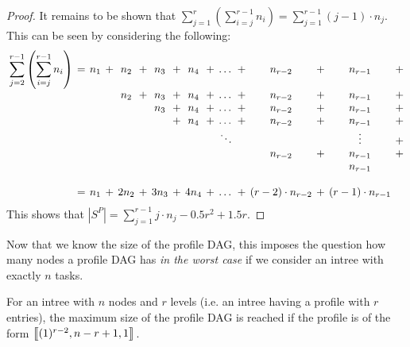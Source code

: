 \begin{proof}
  It remains to be shown that $\sum _{j=1}^{r} \left( \sum _{i=j}^{r-1}n_{{i}} \right) = \sum_{j=1}^{r-1}(j-1)\cdot n_j$. This can be seen by considering the following:
  \begin{eqnarray*}
    \setlength{\arraycolsep}{2pt}
    \begin{array}{cccccccccccccccc}
      \displaystyle
      \sum_{j=2}^{r-1} \left( \sum _{i=j}^{r-1}n_{{i}} \right) &=&
         n_1 & + & n_2 & + & n_3 & + & n_4 & + & \dots & + & n_{r-2} & + & n_{r-1}  & + \\
      & &    &   & n_2 & + & n_3 & + & n_4 & + & \dots & + & n_{r-2} & + & n_{r-1}  & + \\
      & &    &   &     &   & n_3 & + & n_4 & + & \dots & + & n_{r-2} & + & n_{r-1}  & + \\
      & &    &   &     &   &     & + & n_4 & + & \dots & + & n_{r-2} & + & n_{r-1}  & + \\
      & &    &   &     &   &     &  &  &  & \ddots &  &  &  & \vdots  & + \\
      & &    &   &     &   &     &   &     &   &   &   &  n_{r-2}  & +  & n_{r-1}  & +  \\
      & &    &   &     &   &     &   &     &   &   &   &    &   & n_{r-1}  &   \\
      \\
      &=& n_1 &+& 2 n_2 & + & 3 n_3 &+& 4 n_4 &+& \dots & + & (r-2)\cdot n_{r-2} &+& (r-1)\cdot n_{r-1} & \\
    \end{array}
  \end{eqnarray*}
  This shows that $\left|S^P\right| = \sum _{j=1}^{r-1} j \cdot n_j 
    -0.5r^2 + 1.5 r$.
\end{proof}

Now that we know the size of the profile DAG, this imposes the question how many nodes a profile DAG has \emph{in the worst case} if we consider an intree with exactly $n$ tasks.

\begin{lemma}
  \label{lem:profile-dags-form-of-maximum-profile}
  For an intree with $n$ nodes and $r$ levels (i.e. an intree having a profile with $r$ entries), the maximum size of the profile DAG is reached if the profile is of the form $\left\llbracket (1)^{r-2},n-r+1,1 \right\rrbracket$.
\end{lemma}

